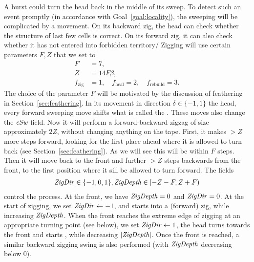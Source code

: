 \documentclass[12pt]{memoir}
\newcommand{\authnote}[3]
{\text{{ \textcolor{#3}{\( \langle\hspace{-0.2em}\langle \)\textsf{\footnotesize #1: #2}\( \rangle\hspace{-0.2em}\rangle \)}}}}
\newcommand{\authnote}[2]{}
\newcommand{\Pnote}[1]{{\authnote{P}{#1}{cyan}}}
\newcommand{\fld}[1]{\ensuremath{\textit{#1\/}}}
\newcommand{\tZig}{f_{\mathrm{zig}}}
\newcommand{\tHeal}{f_{\mathrm{heal}}}
\newcommand{\tRebuild}{f_{\mathrm{rebuild}}}
\newcommand{\F}{F}
\newcommand{\Z}{Z}
\newcommand{\cSweep}{\fld{cSw}}
\newcommand{\ZigDepth}{\fld{ZigDepth}}
\newcommand{\ZigDir}{\fld{ZigDir}}
\begin{document}
A burst could turn the head back in the middle of its sweep.
To detect such an event promptly (in accordance with Goal~\ref{goal:locality}),
the sweeping will be complicated by a  movement.
On its backward zig, the head can check whether the structure of 
last few cells is correct.
On its forward zig, it can also check whether it has not entered into forbidden territory/
Zigging will use certain parameters \( \F,\Z \) that we set to 
 \begin{align*}
     \F    &=7,
\\   \Z   &= 14\F\beta, %
\\  \tZig &= 1,
\quad  \tHeal =2,
\quad  \tRebuild =3.
 \end{align*}
The choice of the parameter \( \F \) will be motivated by the discussion
of feathering in Section~\ref{sec:feathering}.
In its movement in direction \( \delta\in\{-1,1\}  \) the head, every forward sweeping
move shifts what is called the .
These moves also change the \( \cSweep \) field.
Now it will perform a forward-backward zigzag of size approximately \( 2\Z \), without changing anything
on the tape.
First, it makes \( >\Z \) more steps forward, looking for the first place ahead where 
it is allowed to turn back (see Section~\ref{sec:feathering}).
As we will see this will be within \( \F \) steps.
Then it will move back to the front and further \( >\Z \) steps backwards from the front, to
the first position where it sill be allowed to turn forward.
The fields
\begin{align*}
\ZigDir\in\{-1,0,1\}, \ZigDepth\in\lint{-\Z-\F}{\Z+\F}
 \end{align*}
control the process.
At the front, we have \( \ZigDepth=0 \) and \( \ZigDir=0 \).
At the start of zigging, we set \( \ZigDir\gets -1 \), and starts  into a (forward) zig,
while increasing \( \ZigDepth \).
When the front reaches the extreme edge of zigging at an appropriate turning point (see below),
we set \( \ZigDir\gets 1 \),
the head turns towards the front and starts , while decreasing \( |\ZigDepth| \).
Once the front is reached, a similar backward zigging swing is also performed (with \( \ZigDepth \) decreasing below 0).

\end{document}

